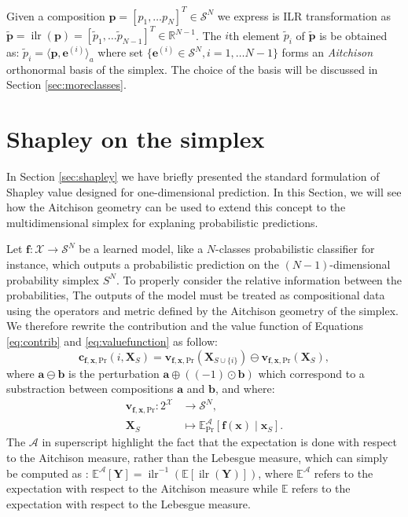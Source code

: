 \documentclass{article}
\theoremstyle{plain}
\theoremstyle{definition}
\theoremstyle{remark}
\DeclareMathOperator{\ilr}{ilr}
\begin{document}
Given a composition $\bm{p} = \left[ p_1,\dots p_N \right]^T \in \mathcal{S}^N$ we express is ILR transformation as $\tilde{\bm{p}} = \ilr \left( \bm{p} \right) = \left[ \tilde{p}_1,\dots \tilde{p}_{N-1} \right]^T \in \mathbb{R}^{N-1}$. The $i$th element $\tilde{p}_i$ of $\tilde{\bm{p}}$ is be obtained as: $\tilde{p}_i = \langle \bm{p}, \bm{e}^{(i)} \rangle_a$ where set $\{\bm{e}^{(i)} \in \mathcal{S}^N, i=1,\dots N-1\}$ forms an \emph{Aitchison} orthonormal basis of the simplex. The choice of the basis will be discussed in Section \ref{sec:moreclasses}.


\section{Shapley on the simplex}

In Section \ref{sec:shapley} we have briefly presented the standard formulation of Shapley value designed for one-dimensional prediction. In this Section, we will see how the Aitchison geometry can be used to extend this concept to the multidimensional simplex for explaning probabilistic predictions.

Let $\bm{f}:\mathcal{X}\to\mathcal{S}^N$ be a learned model, like a $N$-classes probabilistic classifier for instance, which outputs a probabilistic prediction on the $(N-1)$-dimensional probability simplex $S^N$. To properly consider the relative information between the probabilities, The outputs of the model must be treated as compositional data using the operators and metric defined by the Aitchison geometry of the simplex. We therefore rewrite the contribution and the value function of Equations \ref{eq:contrib} and \ref{eq:valuefunction} as follow:
\begin{equation}
  \bm{c}_{\bm{f},\bm{x},\text{Pr}}(i,\bm{X}_S) = \bm{v}_{\bm{f},\bm{x},\text{Pr}}(\bm{X}_{S\cup\{i\}}) \ominus \bm{v}_{\bm{f},\bm{x},\text{Pr}}(\bm{X}_S),
\end{equation}
where $\bm{a}\ominus\bm{b}$ is the perturbation $\bm{a} \oplus \left( (-1)\odot \bm{b}\right)$ which correspond to a substraction between compositions $\bm{a}$ and $\bm{b}$, and where:
\begin{equation}
  \label{eq:valuefunctionsimplex}
  \begin{aligned}
    \bm{v}_{\bm{f},\bm{x},\text{Pr}}: 2^{\mathcal{X}} &\to \mathcal{S}^N,\\
    \bm{X}_S &\mapsto \mathbb{E}^{\mathcal{A}}_\text{Pr}[\bm{f}(\bm{x})\mid \bm{x}_S].
  \end{aligned}
\end{equation}
The $\mathcal{A}$ in superscript highlight the fact that the expectation is done with respect to the Aitchison measure, rather than the Lebesgue measure, which can simply be computed as \cite{pawlowskymodeling}: $\mathbb{E}^{\mathcal{A}}[\bm{Y}] = \ilr^{-1}\left( \mathbb{E} \left[ \ilr\left( \bm{Y} \right) \right] \right)$,
where $\mathbb{E}^{\mathcal{A}}$ refers to the expectation with respect to the Aitchison measure while $\mathbb{E}$ refers to the expectation with respect to the Lebesgue measure.
\end{document}
